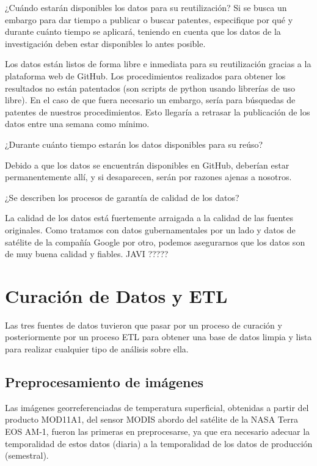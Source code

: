 \documentclass[12pt, spanish]{article}
\begin{document}
\begin{shaded}
¿Cuándo estarán disponibles los datos para su reutilización? Si se busca un embargo para dar tiempo a publicar o buscar patentes, especifique por qué y durante cuánto tiempo se aplicará, teniendo en cuenta que los datos de la investigación deben estar disponibles lo antes posible.
\end{shaded}
Los datos están listos de forma libre e inmediata para su reutilización gracias a la plataforma web de GitHub. Los procedimientos realizados para obtener los resultados no están patentados (son scripts de python usando librerías de uso libre). En el caso de que fuera necesario un embargo, sería para búsquedas de patentes de nuestros procedimientos. Esto llegaría a retrasar la publicación de los datos entre una semana como mínimo.
\\
\begin{shaded}
¿Durante cuánto tiempo estarán los datos disponibles para su reúso?
\end{shaded}
Debido a que los datos se encuentrán disponibles en GitHub, deberían estar permanentemente allí, y si desaparecen, serán por razones ajenas a nosotros.

\begin{shaded}
¿Se describen los procesos de garantía de calidad de los datos?
\end{shaded}
La calidad de los datos está fuertemente arraigada a la calidad de las fuentes originales. Como tratamos con datos gubernamentales por un lado y datos de satélite de la compañía Google por otro, podemos asegurarnos que los datos son de muy buena calidad y fiables.
JAVI ?????



\section{Curación de Datos y ETL}

Las tres fuentes de datos tuvieron que pasar por un proceso de curación y posteriormente por un proceso ETL para obtener una base de datos limpia y lista para realizar cualquier tipo de análisis sobre ella.

\subsection{Preprocesamiento de imágenes}

Las imágenes georreferenciadas de temperatura superficial, obtenidas a partir del producto MOD11A1, del sensor MODIS abordo del satélite de la NASA Terra EOS AM-1, fueron las primeras en preprocesarse, ya que era necesario adecuar la temporalidad de estos datos (diaria) a la temporalidad de los datos de producción (semestral).
\end{document}
